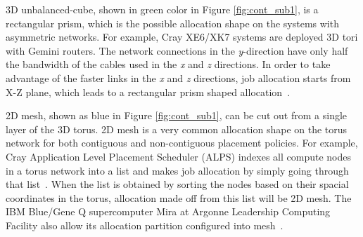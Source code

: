 3D unbalanced-cube, shown in green color in Figure \ref{fig:cont_sub1}, 
is a rectangular prism, which is the possible allocation shape 
on the systems with asymmetric networks. 
For example, Cray XE6/XK7 systems are deployed 3D tori with Gemini routers. 
The network connections in the \emph{y}-direction have 
only half the bandwidth of the cables used in the \emph{x} and \emph{z} directions. 
In order to take advantage of the faster links in the \emph{x} and \emph{z} directions, 
job allocation starts from X-Z plane, 
which leads to a rectangular prism shaped allocation~\cite{RF}.

2D mesh, shown as blue in Figure \ref{fig:cont_sub1}, 
can be cut out from a single layer of the 3D torus. 
2D mesh is a very common allocation shape on the torus network 
for both contiguous and non-contiguous placement policies. 
For example, Cray Application Level Placement Scheduler (ALPS) indexes 
all compute nodes in a torus network into a list and 
makes job allocation by simply going through that list~\cite{carl-cug}. 
When the list is obtained by sorting the nodes based on 
their spacial coordinates in the torus, 
allocation made off from this list will be 2D mesh. 
The IBM Blue/Gene Q supercomputer Mira at Argonne Leadership Computing Facility 
also allow its allocation partition configured into mesh~\cite{zhou-ipdps}. 

